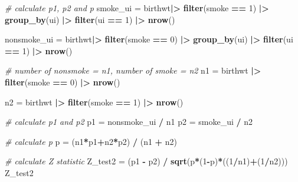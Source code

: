 \documentclass[
]{article}
\newenvironment{Shaded}{\begin{snugshade}}{\end{snugshade}}
\newcommand{\CommentTok}[1]{\textcolor[rgb]{0.56,0.35,0.01}{\textit{#1}}}
\newcommand{\DecValTok}[1]{\textcolor[rgb]{0.00,0.00,0.81}{#1}}
\newcommand{\FunctionTok}[1]{\textcolor[rgb]{0.13,0.29,0.53}{\textbf{#1}}}
\newcommand{\NormalTok}[1]{#1}
\newcommand{\OtherTok}[1]{\textcolor[rgb]{0.56,0.35,0.01}{#1}}
\newcommand{\SpecialCharTok}[1]{\textcolor[rgb]{0.81,0.36,0.00}{\textbf{#1}}}
\begin{document}
\begin{Shaded}
\begin{Highlighting}[]
\CommentTok{\# calculate p1, p2 and p}
\NormalTok{smoke\_ui }\OtherTok{=} 
\NormalTok{  birthwt}\SpecialCharTok{|\textgreater{}}
  \FunctionTok{filter}\NormalTok{(smoke }\SpecialCharTok{==} \DecValTok{1}\NormalTok{) }\SpecialCharTok{|\textgreater{}} 
  \FunctionTok{group\_by}\NormalTok{(ui) }\SpecialCharTok{|\textgreater{}}
  \FunctionTok{filter}\NormalTok{(ui }\SpecialCharTok{==} \DecValTok{1}\NormalTok{) }\SpecialCharTok{|\textgreater{}}
  \FunctionTok{nrow}\NormalTok{()}

\NormalTok{nonsmoke\_ui }\OtherTok{=} 
\NormalTok{  birthwt}\SpecialCharTok{|\textgreater{}}
  \FunctionTok{filter}\NormalTok{(smoke }\SpecialCharTok{==} \DecValTok{0}\NormalTok{) }\SpecialCharTok{|\textgreater{}} 
  \FunctionTok{group\_by}\NormalTok{(ui) }\SpecialCharTok{|\textgreater{}}
  \FunctionTok{filter}\NormalTok{(ui }\SpecialCharTok{==} \DecValTok{1}\NormalTok{) }\SpecialCharTok{|\textgreater{}}
  \FunctionTok{nrow}\NormalTok{()}

\CommentTok{\# number of nonsmoke = n1, number of smoke = n2}
\NormalTok{n1 }\OtherTok{=} 
\NormalTok{  birthwt }\SpecialCharTok{|\textgreater{}}
  \FunctionTok{filter}\NormalTok{(smoke }\SpecialCharTok{==} \DecValTok{0}\NormalTok{) }\SpecialCharTok{|\textgreater{}}
  \FunctionTok{nrow}\NormalTok{()}

\NormalTok{n2 }\OtherTok{=} 
\NormalTok{  birthwt }\SpecialCharTok{|\textgreater{}}
  \FunctionTok{filter}\NormalTok{(smoke }\SpecialCharTok{==} \DecValTok{1}\NormalTok{) }\SpecialCharTok{|\textgreater{}}
  \FunctionTok{nrow}\NormalTok{()}

\CommentTok{\# calculate p1 and p2 }
\NormalTok{p1 }\OtherTok{=}\NormalTok{ nonsmoke\_ui }\SpecialCharTok{/}\NormalTok{ n1}
\NormalTok{p2 }\OtherTok{=}\NormalTok{ smoke\_ui }\SpecialCharTok{/}\NormalTok{ n2}

\CommentTok{\# calculate p}
\NormalTok{p }\OtherTok{=}\NormalTok{ (n1}\SpecialCharTok{*}\NormalTok{p1}\SpecialCharTok{+}\NormalTok{n2}\SpecialCharTok{*}\NormalTok{p2) }\SpecialCharTok{/}\NormalTok{ (n1 }\SpecialCharTok{+}\NormalTok{ n2)}

\CommentTok{\# calculate Z statistic}
\NormalTok{Z\_test2 }\OtherTok{=}\NormalTok{ (p1 }\SpecialCharTok{{-}}\NormalTok{ p2) }\SpecialCharTok{/} \FunctionTok{sqrt}\NormalTok{(p}\SpecialCharTok{*}\NormalTok{(}\DecValTok{1}\SpecialCharTok{{-}}\NormalTok{p)}\SpecialCharTok{*}\NormalTok{((}\DecValTok{1}\SpecialCharTok{/}\NormalTok{n1)}\SpecialCharTok{+}\NormalTok{(}\DecValTok{1}\SpecialCharTok{/}\NormalTok{n2)))}
\NormalTok{Z\_test2}
\end{Highlighting}
\end{Shaded}
\end{document}
